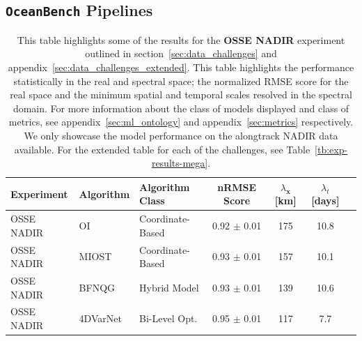 \subsection{\texttt{OceanBench} Pipelines}

\begin{table}[h]
\caption{This table highlights some of the results for the \textbf{OSSE NADIR} experiment outlined in section~\ref{sec:data_challenges} and appendix~\ref{sec:data_challenges_extended}.
This table highlights the performance statistically in the real and spectral space; the normalized RMSE score for the real space and the minimum spatial and temporal scales resolved in the spectral domain. 
For more information about the class of models displayed and class of metrics, see appendix~\ref{sec:ml_ontology} and appendix~\ref{sec:metrics} respectively. We only showcase the model performance on the alongtrack NADIR data available. For the extended table for each of the challenges, see Table~\ref{tb:exp-results-mega}.}
\label{tb:oceanbench_results}
\centering
\begin{tabular}{lllcccc}
 \toprule
Experiment &  Algorithm &   Algorithm Class &  nRMSE Score & $\lambda_{\mathbf{x}}$ [km]  & $\lambda_{t}$ [days]      \\ \midrule
\multicolumn{1}{l}{OSSE NADIR}     &  OI~\cite{DUACS} &  Coordinate-Based & 0.92 $\pm$ 0.01 & 175 & 10.8 \\
\multicolumn{1}{l}{OSSE NADIR}     &  MIOST~\cite{MIOST} &  Coordinate-Based  & 0.93 $\pm$ 0.01 & 157 & 10.1 \\
\multicolumn{1}{l}{OSSE NADIR}     &  BFNQG~\cite{BFNQG} &  Hybrid Model   & 0.93 $\pm$ 0.01 & 139 & 10.6 \\
OSSE NADIR &  4DVarNet~\cite{4DVARNETSWOT} &  Bi-Level Opt.  & 0.95 $\pm$ 0.01 & 117 & 7.7 \\
\bottomrule
\end{tabular}
\end{table}



